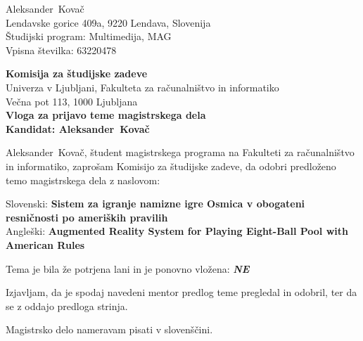 \documentclass[a4paper, 12pt]{article}
\begin{document}
\newcommand{\ImeKandidata}{Aleksander} %
\newcommand{\PriimekKandidata}{Kovač} %
\newcommand{\VpisnaStevilka}{63220478} %
\newcommand{\StudijskiProgram}{Multimedija, MAG} %
\newcommand{\NaslovBivalisca}{Lendavske gorice 409a, 9220 Lendava, Slovenija} %
\newcommand{\SLONaslov}{Sistem za igranje namizne igre Osmica v obogateni resničnosti po ameriških pravilih} %
\newcommand{\ENGNaslov}{Augmented Reality System for Playing Eight-Ball Pool with American Rules} %


\newcommand{\Kandidat}{\ImeKandidata~\PriimekKandidata}
\noindent
\Kandidat\\
\NaslovBivalisca \\
Študijski program: \StudijskiProgram \\
Vpisna številka: \VpisnaStevilka
\bigskip

{\bf Komisija za študijske zadeve}\\
Univerza v Ljubljani, Fakulteta za računalništvo in informatiko\\
Večna pot 113, 1000 Ljubljana\\

{\Large\bf
{\centering
    Vloga za prijavo teme magistrskega dela \\%
\large Kandidat: \Kandidat \\[10mm]}}


\Kandidat, študent magistrskega programa na Fakulteti za računalništvo in informatiko, zaprošam Komisijo za študijske zadeve, da odobri predloženo temo magistrskega dela z naslovom:

Slovenski: {\bf \SLONaslov}\\
Angleški: {\bf \ENGNaslov}

Tema je bila že potrjena lani in je ponovno vložena: {\bf \textit{NE} }

Izjavljam, da je spodaj navedeni mentor predlog teme pregledal in odobril, ter da se z oddajo predloga strinja.

Magistrsko delo nameravam pisati v slovenščini. %
\end{document}
